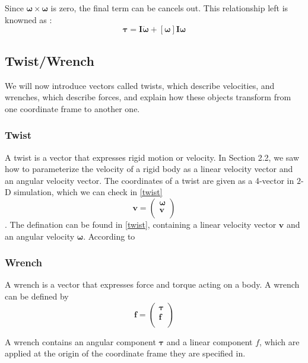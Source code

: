 Since $\pmb{\omega} \times \pmb{\omega}$ is zero, the final term can be cancels out. This relationship left is knowned as :
\begin{equation}
    \pmb{\tau} = \pmb{I}\dot{\pmb{\omega}} + [\pmb{\omega}]\pmb{I}\pmb{\omega}
\end{equation}


\subsection{Twist/Wrench}
We will now introduce vectors called twists, which describe velocities, and wrenches, which describe forces, and explain how these objects transform from one coordinate frame to another one. 
    \subsubsection{Twist} 
        A twist is a vector that expresses rigid motion or velocity. In Section 2.2, we saw how to parameterize the velocity of a rigid body as a linear velocity vector and an angular velocity vector. The coordinates of a twist are given as a 4-vector in $2$-D simulation, which we can check in \ref{twist}
            \begin{equation}
                \mathbf{v} = \left( \begin{array}{c} \pmb{\omega} \\ \pmb{v} \\ \end{array} \right )
                \label{twist}
            \end{equation}.
        The defination can be found in \ref{twist}, containing a linear velocity vector \(\pmb{v}\) and an angular velocity \(\pmb{\omega}\). According to 

    \subsubsection{Wrench}
        A wrench is a vector that expresses force and torque acting on a body. A wrench can be defined by
        \begin{equation}
            \mathbf{f} = \left( \begin{array}{c} \pmb{\tau} \\ \pmb{f} \\ \end{array} \right ) 
        \end{equation}

        A wrench contains an angular component $\pmb{\tau}$ and a linear component $f$, which are applied at the origin of the coordinate frame they are specified in.


